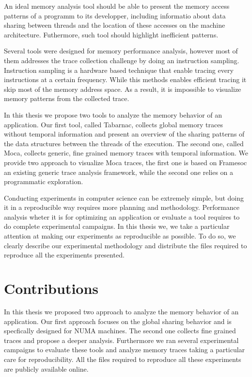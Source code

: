 An ideal memory analysis tool should be able to present the memory access patterns of a programm to its developper, including informatio about data sharing between threads and the location of these accesses on the machine architecture.
Futhermore, such tool should highlight inefficient patterns.

Several tools were designed for memory performance analysis, however most of them addresses the trace collection challenge by doing an instruction sampling.
Instruction sampling is a hardware based technique that enable tracing every instructions at a certain frequency.
While this methods enables efficient tracing it skip most of the memory address space.
As a result, it is impossible to visualize memory patterns from the collected trace.

In this thesis we propose two tools to analyze the memory behavior of an application.
Our first tool, called \gls{Tabarnac}, collects global memory traces without temporal information and present an overview of the sharing patterns of the data structures between the threads of the execution.
The second one, called \gls{Moca}, collects generic, fine grained  memory traces with temporal information.
We provide two approach to visualize \gls{Moca} traces, the first one is based on \gls{Framesoc} an existing generic trace analysis framework, while the second one relies on a programmatic exploration.

Conducting experiments in computer science can be extremely simple, but doing it in a reproducible way requires more planning and methodology.
Performance analysis wheter it is for optimizing an application or evaluate a tool requires to do complete experimental campaigns.
In this thesis we, we take a particular attention at making our experiments as reproducible as possible.
To do so, we clearly describe our experimental methodology and distribute the files required to reproduce all the experiments presented.

\section{Contributions}

In this thesis we proposed two approach to analyze the memory behavior of an application.
Our first approach focuses on the global sharing behavior and is specfically designed for \gls{NUMA} machines.
The second one collects fine grained traces and propose a deeper analysis.
Furthermore we ran several experimental campaigns to evaluate these tools and analyze memory traces taking a particular care for reproducibility.
All the files required to reproduce all these experiments are publicly available online.


